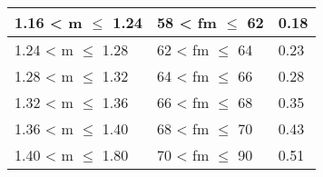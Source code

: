 \begin{table}[ht!]
\begin{tabular}{|l|l|l|}
		1.16 < m $\leq$ 1.24                                                                            & 58 < fm $\leq$ 62                                                                                                    & 0.18                        \\ \hline
		1.24 < m $\leq$ 1.28                                                                            & 62 < fm $\leq$ 64                                                                                                    & 0.23                        \\ \hline
		1.28 < m $\leq$ 1.32                                                                            & 64 < fm $\leq$ 66                                                                                                    & 0.28                        \\ \hline
		1.32 < m $\leq$ 1.36                                                                            & 66 < fm $\leq$ 68                                                                                                    & 0.35                        \\ \hline
		1.36 < m $\leq$ 1.40                                                                             & 68 < fm $\leq$ 70                                                                                                    & 0.43                        \\ \hline
		1.40 < m $\leq$ 1.80                                                                              & 70 < fm $\leq$ 90                                                                                                    & 0.51                        \\ \hline
	\end{tabular}
	\caption{}\label{Test3}
\end{table}

